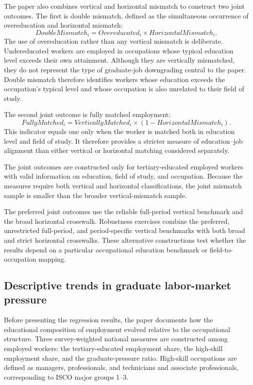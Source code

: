 The paper also combines vertical and horizontal mismatch to construct two joint outcomes. The first is double mismatch, defined as the simultaneous occurrence of overeducation and horizontal mismatch:
\begin{equation}
DoubleMismatch_{i} = Overeducated_{i} \times HorizontalMismatch_{i}.
\end{equation}
The use of overeducation rather than any vertical mismatch is deliberate. Undereducated workers are employed in occupations whose typical education level exceeds their own attainment. Although they are vertically mismatched, they do not represent the type of graduate-job downgrading central to the paper. Double mismatch therefore identifies workers whose education exceeds the occupation's typical level and whose occupation is also unrelated to their field of study.

The second joint outcome is fully matched employment:
\begin{equation}
FullyMatched_{i} = VerticallyMatched_{i} \times \left( 1 - HorizontalMismatch_{i} \right).
\end{equation}
This indicator equals one only when the worker is matched both in education level and field of study. It therefore provides a stricter measure of education--job alignment than either vertical or horizontal matching considered separately.

The joint outcomes are constructed only for tertiary-educated employed workers with valid information on education, field of study, and occupation. Because the measures require both vertical and horizontal classifications, the joint mismatch sample is smaller than the broader vertical-mismatch sample.

The preferred joint outcomes use the reliable full-period vertical benchmark and the broad horizontal crosswalk. Robustness exercises combine the preferred, unrestricted full-period, and period-specific vertical benchmarks with both broad and strict horizontal crosswalks. These alternative constructions test whether the results depend on a particular occupational education benchmark or field-to-occupation mapping.

\subsection{Descriptive trends in graduate labor-market pressure}

Before presenting the regression results, the paper documents how the educational composition of employment evolved relative to the occupational structure. Three survey-weighted national measures are constructed among employed workers: the tertiary-educated employment share, the high-skill employment share, and the graduate-pressure ratio. High-skill occupations are defined as managers, professionals, and technicians and associate professionals, corresponding to ISCO major groups 1--3.

